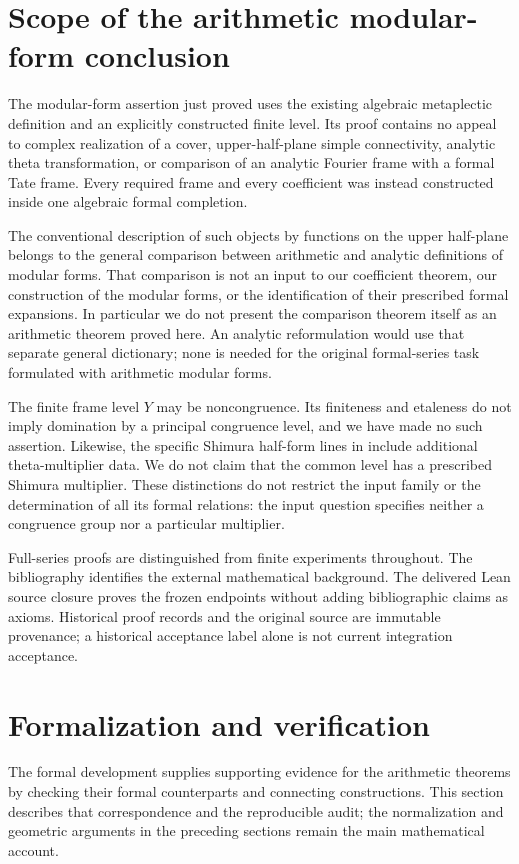 \documentclass[11pt]{article}
\theoremstyle{remark}\newtheorem{remark}[theorem]{Remark}
\begin{document}
\section{Scope of the arithmetic modular-form conclusion}\label{scope}
The modular-form assertion just proved uses the existing algebraic
metaplectic definition and an explicitly constructed finite level.
Its proof contains no appeal to complex realization of a cover,
upper-half-plane simple connectivity, analytic theta transformation,
or comparison of an analytic Fourier frame with a formal Tate frame.
Every required frame and every coefficient was instead constructed
inside one algebraic formal completion.

The conventional description of such objects by functions on the
upper half-plane belongs to the general comparison between arithmetic
and analytic definitions of modular forms. That comparison is not an
input to our coefficient theorem, our construction of the modular
forms, or the identification of their prescribed formal expansions.
In particular we do not present the comparison theorem itself as an
arithmetic theorem proved here. An analytic reformulation would use
that separate general dictionary; none is needed for the original
formal-series task formulated with arithmetic modular forms.

The finite frame level $Y$ may be noncongruence. Its finiteness and
etaleness do not imply domination by a principal congruence level,
and we have made no such assertion. Likewise, the specific Shimura
half-form lines in \cite[Definitions 3.4.1 and 3.4.4]{candelori}
include additional theta-multiplier data. We do not claim that the
common level has a prescribed Shimura multiplier. These distinctions
do not restrict the input family or the determination of all its
formal relations: the input question specifies neither a congruence
group nor a particular multiplier.

Full-series proofs are distinguished from finite experiments throughout.
The bibliography identifies the external mathematical background. The delivered
Lean source closure proves the frozen endpoints without adding bibliographic
claims as axioms. Historical proof records and the original source are immutable
provenance; a historical acceptance label alone is not current integration
acceptance.


\section{Formalization and verification}\label{formalization}
The formal development supplies supporting evidence for the arithmetic
theorems by checking their formal counterparts and connecting constructions.
This section describes that correspondence and the reproducible audit;
the normalization and geometric arguments in the preceding sections remain
the main mathematical account.
\end{document}
